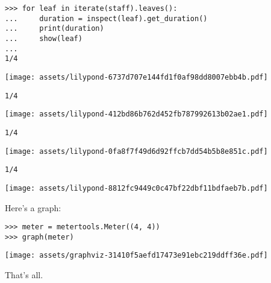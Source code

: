 \documentclass{article}
\begin{document}
\begin{comment}
<abjad>
for leaf in iterate(staff).leaves():
    duration = inspect(leaf).get_duration()
    print(duration)
    show(leaf)

</abjad>
\end{comment}

\begin{singlespacing}
\begin{lstlisting}
>>> for leaf in iterate(staff).leaves():
...     duration = inspect(leaf).get_duration()
...     print(duration)
...     show(leaf)
...
1/4
\end{lstlisting}
\noindent\texttt{[image: assets/lilypond-6737d707e144fd1f0af98dd8007ebb4b.pdf]}
\begin{lstlisting}
1/4
\end{lstlisting}
\noindent\texttt{[image: assets/lilypond-412bd86b762d452fb787992613b02ae1.pdf]}
\begin{lstlisting}
1/4
\end{lstlisting}
\noindent\texttt{[image: assets/lilypond-0fa8f7f49d6d92ffcb7dd54b5b8e851c.pdf]}
\begin{lstlisting}
1/4
\end{lstlisting}
\noindent\texttt{[image: assets/lilypond-8812fc9449c0c47bf22dbf11bdfaeb7b.pdf]}
\end{singlespacing}

Here's a graph:

\begin{comment}
<abjad>
meter = metertools.Meter((4, 4))
graph(meter)
</abjad>
\end{comment}

\begin{singlespacing}
\begin{lstlisting}
>>> meter = metertools.Meter((4, 4))
>>> graph(meter)
\end{lstlisting}
\noindent\texttt{[image: assets/graphviz-31410f5aefd17473e91ebc219ddff36e.pdf]}
\end{singlespacing}

That's all.
\end{document}

